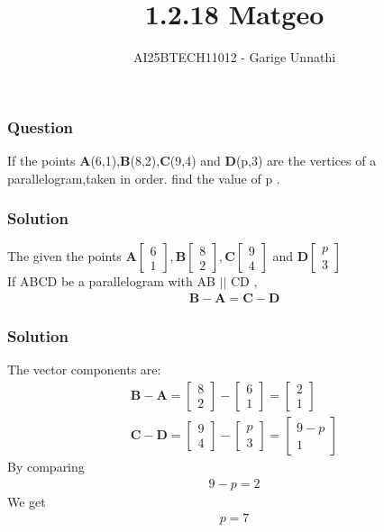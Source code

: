 \documentclass{beamer}
\title{1.2.18 Matgeo}
\author{AI25BTECH11012 - Garige Unnathi}
\date{}
\begin{document}
\frame{\titlepage}

\begin{frame}
\frametitle{Question}
If the points \textbf{A}(6,1),\textbf{B}(8,2),\textbf{C}(9,4) and \textbf{D}(p,3) are the vertices of a parallelogram,taken in order. find the value of p .
\\\end{frame}




\begin{frame}
\frametitle{Solution}
The given the points $\textbf{A}\begin{bmatrix}6 \\ 1 \end{bmatrix} , \textbf{B}\begin{bmatrix}8 \\ 2\end{bmatrix} , \textbf{C}\begin{bmatrix}9 \\ 4\end{bmatrix}$ and $\textbf{D}\begin{bmatrix}p \\ 3\end{bmatrix}$\\
\vspace{1em}
 If ABCD be a parallelogram with AB $||$ CD ,
\begin{align*}
\textbf{$\textbf{B}-\textbf{A} = \textbf{C}-\textbf{D}$}
\end{align*}
 \end{frame}



\begin{frame}
\frametitle{Solution}
The vector components are:
\begin{align}
   \textbf{B} - \textbf{A} =\begin{bmatrix}8 \\ 2\end{bmatrix} - \begin{bmatrix}6 \\ 1\end{bmatrix} = \begin{bmatrix}2 \\ 1\end{bmatrix}\\
   \textbf{C}- \textbf{D}=\begin{bmatrix}9 \\ 4\end{bmatrix} - \begin{bmatrix}p \\ 3\end{bmatrix} = \begin{bmatrix}9-p \\ 1\end{bmatrix}
\end{align}
By comparing 
\begin{align}
    9-p = 2
\end{align}
We get 
\begin{align}
    p = 7
\end{align}

\end{frame}
\end{document}
